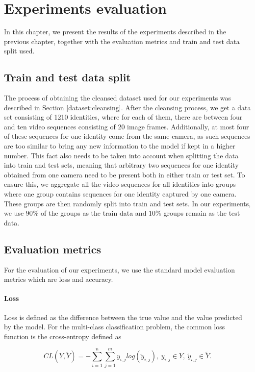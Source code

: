 \chapter{Experiments evaluation} \label{ch:results}
In this chapter, we present the results of the experiments described in the previous chapter, together with the evaluation metrics and train and test data split used.

\section{Train and test data split}
The process of obtaining the cleansed dataset used for our experiments was described in Section \ref{dataset:cleansing}. After the cleansing process, we get a data set consisting of 1210 identities, where for each of them, there are between four and ten video sequences consisting of 20 image frames. Additionally, at most four of these sequences for one identity come from the same camera, as such sequences are too similar to bring any new information to the model if kept in a higher number. This fact also needs to be taken into account when splitting the data into train and test sets, meaning that arbitrary two sequences for one identity obtained from one camera need to be present both in either train or test set. To ensure this, we aggregate all the video sequences for all identities into groups where one group contains sequences for one identity captured by one camera. These groups are then randomly split into train and test sets. In our experiments, we use $90\%$ of the groups as the train data and $10\%$ groups remain as the test data.

\section{Evaluation metrics}
For the evaluation of our experiments, we use the standard model evaluation metrics which are loss and accuracy.

\subsubsection{Loss}
Loss is defined as the difference between the true value and the value predicted by the model. For the multi-class classification problem, the common loss function is the cross-entropy defined as

\begin{equation}
    CL(Y,\tilde{Y})=-\sum_{i=1}^{n}\sum_{j=1}^{m}y_{i,j}log(\tilde{y}_{i,j}), \: y_{i,j}\in Y, \: \tilde{y}_{i,j}\in \tilde{Y}.
\end{equation}

